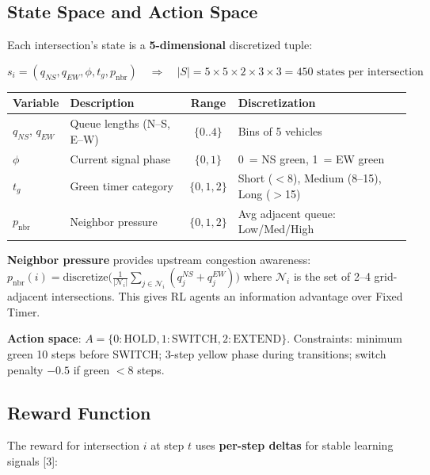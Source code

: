\documentclass[11pt, a4paper]{article}
\begin{document}
\subsection{State Space and Action Space}

Each intersection's state is a \textbf{5-dimensional} discretized tuple:

\begin{equation}
    s_i = (q_{NS}, q_{EW}, \phi, t_g, p_{\text{nbr}}) \quad \Rightarrow \quad |S| = 5 \times 5 \times 2 \times 3 \times 3 = 450 \text{ states per intersection}
\end{equation}

\begin{table}[H]
\centering
\small
\begin{tabularx}{\textwidth}{l l c X}
    \toprule
    \textbf{Variable} & \textbf{Description} & \textbf{Range} & \textbf{Discretization} \\
    \midrule
    $q_{NS}$, $q_{EW}$ & Queue lengths (N--S, E--W) & $\{0..4\}$ & Bins of 5 vehicles \\
    $\phi$ & Current signal phase & $\{0, 1\}$ & 0~= NS green, 1~= EW green \\
    $t_g$ & Green timer category & $\{0, 1, 2\}$ & Short ($<$8), Medium (8--15), Long ($>$15) \\
    $p_{\text{nbr}}$ & Neighbor pressure & $\{0, 1, 2\}$ & Avg adjacent queue: Low/Med/High \\
    \bottomrule
\end{tabularx}
\end{table}

\textbf{Neighbor pressure} provides upstream congestion awareness:
$p_{\text{nbr}}(i) = \text{discretize}\big(\frac{1}{|\mathcal{N}_i|} \sum_{j \in \mathcal{N}_i} (q_j^{NS} + q_j^{EW})\big)$
where $\mathcal{N}_i$ is the set of 2--4 grid-adjacent intersections. This gives RL agents an information advantage over Fixed Timer.

\textbf{Action space}: $A = \{0: \text{HOLD}, 1: \text{SWITCH}, 2: \text{EXTEND}\}$. Constraints: minimum green 10 steps before SWITCH; 3-step yellow phase during transitions; switch penalty $-0.5$ if green $< 8$ steps.

\subsection{Reward Function}

The reward for intersection $i$ at step $t$ uses \textbf{per-step deltas} for stable learning signals [3]:
\end{document}

